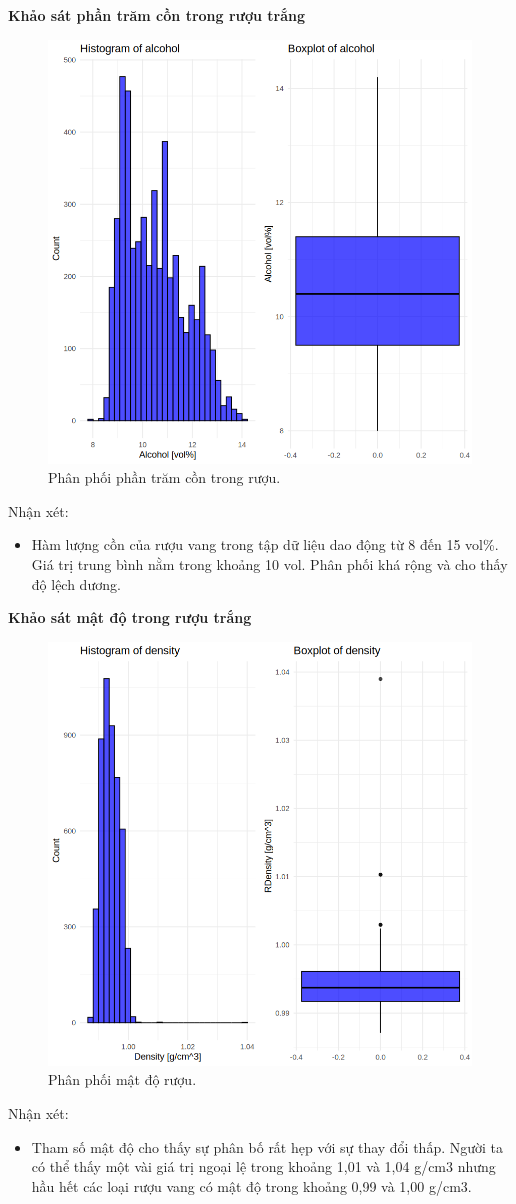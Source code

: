 \textbf{Khảo sát phần trăm cồn trong rượu trắng}
\begin{figure}[H]
    \centering
    \includegraphics[width=0.75\columnwidth]{wine_figures/white_alcohol.png}
    \caption{Phân phối phần trăm cồn trong rượu.}
    \label{fig:white_alcohol}
\end{figure}
Nhận xét:
\begin{itemize}
    \item Hàm lượng cồn của rượu vang trong tập dữ liệu dao động từ 8 đến 15 vol\%. Giá trị trung bình nằm trong khoảng 10 vol. Phân phối khá rộng và cho thấy độ lệch dương.
\end{itemize}

\textbf{Khảo sát mật độ trong rượu trắng}
\begin{figure}[H]
    \centering
    \includegraphics[width=0.75\columnwidth]{wine_figures/white_density.png}
    \caption{Phân phối mật độ rượu.}
    \label{fig:white_density}
\end{figure}
Nhận xét:
\begin{itemize}
    \item Tham số mật độ cho thấy sự phân bố rất hẹp với sự thay đổi thấp. Người ta có thể thấy một vài giá trị ngoại lệ trong khoảng 1,01 và 1,04 g/cm3 nhưng hầu hết các loại rượu vang có mật độ trong khoảng 0,99 và 1,00 g/cm3.
\end{itemize}

